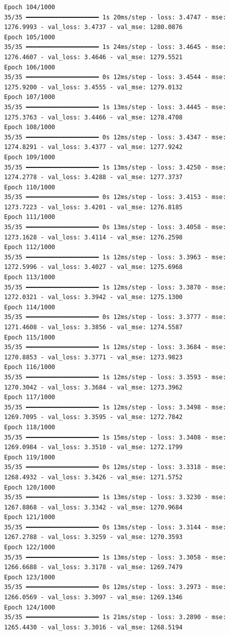 \documentclass[
  letterpaper,
  DIV=11,
  numbers=noendperiod]{scrreprt}
\begin{document}
\begin{verbatim}
Epoch 104/1000
35/35 ━━━━━━━━━━━━━━━━━━━━ 1s 20ms/step - loss: 3.4747 - mse: 1276.9993 - val_loss: 3.4737 - val_mse: 1280.0876
Epoch 105/1000
35/35 ━━━━━━━━━━━━━━━━━━━━ 1s 24ms/step - loss: 3.4645 - mse: 1276.4607 - val_loss: 3.4646 - val_mse: 1279.5521
Epoch 106/1000
35/35 ━━━━━━━━━━━━━━━━━━━━ 0s 12ms/step - loss: 3.4544 - mse: 1275.9200 - val_loss: 3.4555 - val_mse: 1279.0132
Epoch 107/1000
35/35 ━━━━━━━━━━━━━━━━━━━━ 1s 13ms/step - loss: 3.4445 - mse: 1275.3763 - val_loss: 3.4466 - val_mse: 1278.4708
Epoch 108/1000
35/35 ━━━━━━━━━━━━━━━━━━━━ 0s 12ms/step - loss: 3.4347 - mse: 1274.8291 - val_loss: 3.4377 - val_mse: 1277.9242
Epoch 109/1000
35/35 ━━━━━━━━━━━━━━━━━━━━ 1s 13ms/step - loss: 3.4250 - mse: 1274.2778 - val_loss: 3.4288 - val_mse: 1277.3737
Epoch 110/1000
35/35 ━━━━━━━━━━━━━━━━━━━━ 0s 12ms/step - loss: 3.4153 - mse: 1273.7223 - val_loss: 3.4201 - val_mse: 1276.8185
Epoch 111/1000
35/35 ━━━━━━━━━━━━━━━━━━━━ 0s 13ms/step - loss: 3.4058 - mse: 1273.1628 - val_loss: 3.4114 - val_mse: 1276.2598
Epoch 112/1000
35/35 ━━━━━━━━━━━━━━━━━━━━ 1s 12ms/step - loss: 3.3963 - mse: 1272.5996 - val_loss: 3.4027 - val_mse: 1275.6968
Epoch 113/1000
35/35 ━━━━━━━━━━━━━━━━━━━━ 1s 12ms/step - loss: 3.3870 - mse: 1272.0321 - val_loss: 3.3942 - val_mse: 1275.1300
Epoch 114/1000
35/35 ━━━━━━━━━━━━━━━━━━━━ 0s 12ms/step - loss: 3.3777 - mse: 1271.4608 - val_loss: 3.3856 - val_mse: 1274.5587
Epoch 115/1000
35/35 ━━━━━━━━━━━━━━━━━━━━ 1s 12ms/step - loss: 3.3684 - mse: 1270.8853 - val_loss: 3.3771 - val_mse: 1273.9823
Epoch 116/1000
35/35 ━━━━━━━━━━━━━━━━━━━━ 1s 12ms/step - loss: 3.3593 - mse: 1270.3042 - val_loss: 3.3684 - val_mse: 1273.3962
Epoch 117/1000
35/35 ━━━━━━━━━━━━━━━━━━━━ 1s 12ms/step - loss: 3.3498 - mse: 1269.7095 - val_loss: 3.3595 - val_mse: 1272.7842
Epoch 118/1000
35/35 ━━━━━━━━━━━━━━━━━━━━ 1s 15ms/step - loss: 3.3408 - mse: 1269.0984 - val_loss: 3.3510 - val_mse: 1272.1799
Epoch 119/1000
35/35 ━━━━━━━━━━━━━━━━━━━━ 0s 12ms/step - loss: 3.3318 - mse: 1268.4932 - val_loss: 3.3426 - val_mse: 1271.5752
Epoch 120/1000
35/35 ━━━━━━━━━━━━━━━━━━━━ 1s 13ms/step - loss: 3.3230 - mse: 1267.8868 - val_loss: 3.3342 - val_mse: 1270.9684
Epoch 121/1000
35/35 ━━━━━━━━━━━━━━━━━━━━ 0s 13ms/step - loss: 3.3144 - mse: 1267.2788 - val_loss: 3.3259 - val_mse: 1270.3593
Epoch 122/1000
35/35 ━━━━━━━━━━━━━━━━━━━━ 1s 13ms/step - loss: 3.3058 - mse: 1266.6688 - val_loss: 3.3178 - val_mse: 1269.7479
Epoch 123/1000
35/35 ━━━━━━━━━━━━━━━━━━━━ 0s 12ms/step - loss: 3.2973 - mse: 1266.0569 - val_loss: 3.3097 - val_mse: 1269.1346
Epoch 124/1000
35/35 ━━━━━━━━━━━━━━━━━━━━ 1s 21ms/step - loss: 3.2890 - mse: 1265.4430 - val_loss: 3.3016 - val_mse: 1268.5194

\end{verbatim}
\end{document}
